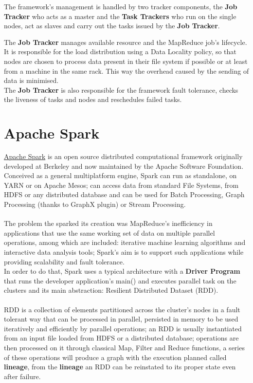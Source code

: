 The framework's management is handled by two tracker components, the \textbf{Job Tracker} who acts as a master and the \textbf{Task Trackers} who run on the single nodes, act as slaves and carry out the tasks issued by the \textbf{Job Tracker}.

The \textbf{Job Tracker} manages available resource and the MapReduce job's lifecycle.\\ It is responsible for the load distribution using a Data Locality policy, so that nodes are chosen to process data present in their file system if possible or at least from a machine in the same rack. This way the overhead caused by the sending of data is minimised.
\\
The \textbf{Job Tracker} is also responsible for the framework fault tolerance, checks the liveness of tasks and nodes and reschedules failed tasks.
 \pagebreak
 
\section{Apache Spark} \label{Spark}

\href{https://spark.apache.org/}{Apache Spark} is an open source distributed computational framework originally developed at Berkeley and now maintained by the Apache Software Foundation.
\\
Conceived as a general multiplatform engine, Spark can run as standalone, on YARN or on Apache Mesos; can access data from standard File Systems, from HDFS or any distributed database and can be used for Batch Processing, Graph Processing (thanks to GraphX plugin) or Stream Processing.
\\
\\
The problem the sparked its creation was MapReduce's inefficiency in applications that use the same working set of data on multiple parallel operations, among which are included: iterative machine learning algorithms and interactive data analysis tools\cite{Zaharia:2010:SCC:1863103.1863113}; Spark's aim is to support such applications while providing scalability and fault tolerance.
\\
In order to do that, Spark uses a typical architecture with a \textbf{Driver Program} that runs the developer application's main() and executes parallel task on the clusters and its main abstraction: Resilient Distributed Dataset (RDD).
\\
\\
RDD is a collection of elements partitioned across the cluster's nodes in a fault tolerant way that can be processed in parallel, persisted in memory to be used iteratively and efficiently by parallel operations; an RDD is usually instantiated from an input file loaded from HDFS or a distributed database; operations are then processed on it through classical Map, Filter and Reduce functions, a series of these operations will produce a graph with the execution planned called \textbf{lineage}, from the \textbf{lineage} an RDD can be reinstated to its proper state even after failure.


